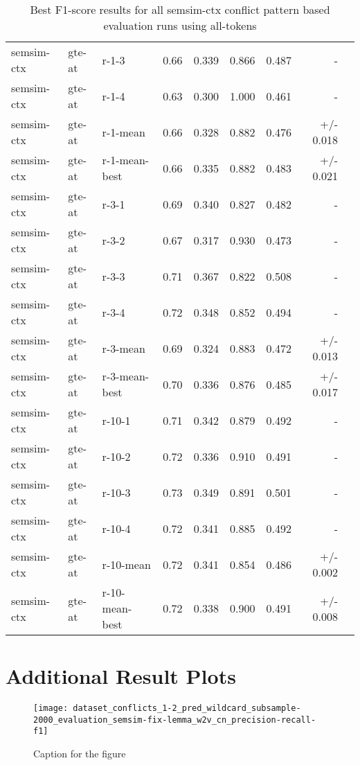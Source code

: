 \begin{table}[H]
\begin{tabular}{lllrrrrrr}
semsim-ctx & gte-at & r-1-3 & 0.66 & 0.339 & 0.866 & 0.487 & - \\
semsim-ctx & gte-at & r-1-4 & 0.63 & 0.300 & 1.000 & 0.461 & - \\
semsim-ctx & gte-at & r-1-mean & 0.66 & 0.328 & 0.882 & 0.476 & +/- 0.018 \\
semsim-ctx & gte-at & r-1-mean-best & 0.66 & 0.335 & 0.882 & 0.483 & +/- 0.021 \\
\hline
semsim-ctx & gte-at & r-3-1 & 0.69 & 0.340 & 0.827 & 0.482 & - \\
semsim-ctx & gte-at & r-3-2 & 0.67 & 0.317 & 0.930 & 0.473 & - \\
semsim-ctx & gte-at & r-3-3 & 0.71 & 0.367 & 0.822 & 0.508 & - \\
semsim-ctx & gte-at & r-3-4 & 0.72 & 0.348 & 0.852 & 0.494 & - \\
semsim-ctx & gte-at & r-3-mean & 0.69 & 0.324 & 0.883 & 0.472 & +/- 0.013 \\
semsim-ctx & gte-at & r-3-mean-best & 0.70 & 0.336 & 0.876 & 0.485 & +/- 0.017 \\
\hline
semsim-ctx & gte-at & r-10-1 & 0.71 & 0.342 & 0.879 & 0.492 & - \\
semsim-ctx & gte-at & r-10-2 & 0.72 & 0.336 & 0.910 & 0.491 & - \\
semsim-ctx & gte-at & r-10-3 & 0.73 & 0.349 & 0.891 & 0.501 & - \\
semsim-ctx & gte-at & r-10-4 & 0.72 & 0.341 & 0.885 & 0.492 & - \\
semsim-ctx & gte-at & r-10-mean & 0.72 & 0.341 & 0.854 & 0.486 & +/- 0.002 \\
semsim-ctx & gte-at & r-10-mean-best & 0.72 & 0.338 & 0.900 & 0.491 & +/- 0.008 \\
\bottomrule
\end{tabular}
\caption{Best F1-score results for all semsim-ctx conflict pattern based evaluation runs using all-tokens}
\label{tab:quant-results-semsim-ctx-at}
\end{table}

\newpage
\section{Additional Result Plots}
\label{app-sec:result-plots}

\begin{figure}[htp]
\centering
\texttt{[image: dataset\_conflicts\_1-2\_pred\_wildcard\_subsample-2000\_evaluation\_semsim-fix-lemma\_w2v\_cn\_precision-recall-f1]}
\caption{Caption for the figure}
\label{fig:unique-label-1}
\end{figure}


